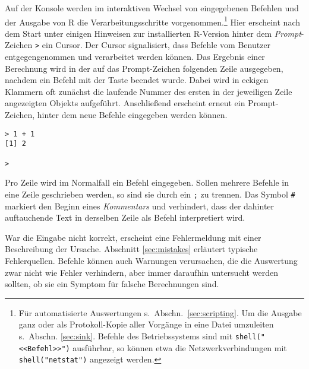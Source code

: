 Auf der Konsole werden im interaktiven Wechsel von eingegebenen Befehlen und der Ausgabe von R die Verarbeitungsschritte vorgenommen.\footnote{Für automatisierte Auswertungen s.\ Abschn.\ \ref{sec:scripting}. Um die Ausgabe ganz oder als Protokoll-Kopie aller Vorgänge in eine Datei umzuleiten s.\ Abschn. \ref{sec:sink}. Befehle des Betriebssystems sind mit \lstinline!shell("<<Befehl>>")! ausführbar, so können etwa die Netzwerkverbindungen mit \lstinline!shell("netstat")! angezeigt werden.} Hier erscheint nach dem Start unter einigen Hinweisen zur installierten R-Version hinter dem \emph{Prompt}-Zeichen \lstinline!>! ein Cursor. Der Cursor signalisiert, dass Befehle vom Benutzer entgegengenommen und verarbeitet werden können. Das Ergebnis einer Berechnung wird in der auf das Prompt-Zeichen folgenden Zeile ausgegeben, nachdem ein Befehl mit der  Taste beendet wurde. Dabei wird in eckigen Klammern oft zunächst die laufende Nummer des ersten in der jeweiligen Zeile angezeigten Objekts aufgeführt. Anschließend erscheint erneut ein Prompt-Zeichen, hinter dem neue Befehle eingegeben werden können.
\begin{lstlisting}
> 1 + 1
[1] 2

>
\end{lstlisting}

Pro Zeile wird im Normalfall ein Befehl eingegeben. Sollen mehrere Befehle in eine Zeile geschrieben werden, so sind sie durch ein \lstinline!;! zu trennen. Das Symbol \lstinline!#! markiert den Beginn eines \emph{Kommentars} und verhindert, dass der dahinter auftauchende Text in derselben Zeile als Befehl interpretiert wird.

War die Eingabe nicht korrekt, erscheint eine Fehlermeldung mit einer Beschreibung der Ursache. Abschnitt \ref{sec:mistakes} erläutert typische Fehlerquellen. Befehle können auch Warnungen verursachen, die die Auswertung zwar nicht wie Fehler verhindern, aber immer daraufhin untersucht werden sollten, ob sie ein Symptom für falsche Berechnungen sind.

